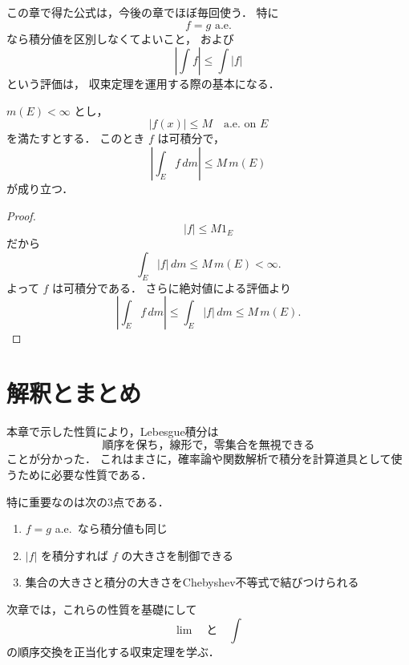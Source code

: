 \begin{remark}
この章で得た公式は，今後の章でほぼ毎回使う．
特に
\[
f=g \text{ a.e.}
\]
なら積分値を区別しなくてよいこと，
および
\[
\left|\int f\right|\le \int |f|
\]
という評価は，
収束定理を運用する際の基本になる．
\end{remark}

\begin{example}
$m(E)<\infty$ とし，
\[
|f(x)|\le M \quad \text{a.e.\ on } E
\]
を満たすとする．
このとき $f$ は可積分で，
\[
\left|\int_E f\,dm\right|\le M\,m(E)
\]
が成り立つ．
\end{example}
\begin{proof}
\[
|f|\le M1_E
\]
だから
\[
\int_E |f|\,dm\le M\,m(E)<\infty.
\]
よって $f$ は可積分である．
さらに絶対値による評価より
\[
\left|\int_E f\,dm\right|
\le
\int_E |f|\,dm
\le
M\,m(E).
\]
\end{proof}

\section{解釈とまとめ}

本章で示した性質により，Lebesgue積分は
\[
\text{順序を保ち，線形で，零集合を無視できる}
\]
ことが分かった．
これはまさに，確率論や関数解析で積分を計算道具として使うために必要な性質である．

特に重要なのは次の3点である．
\begin{enumerate}
    \item $f=g$ a.e.\ なら積分値も同じ
    \item $|f|$ を積分すれば $f$ の大きさを制御できる
    \item 集合の大きさと積分の大きさをChebyshev不等式で結びつけられる
\end{enumerate}

次章では，これらの性質を基礎にして
\[
\lim \quad \text{と} \quad \int
\]
の順序交換を正当化する収束定理を学ぶ．
